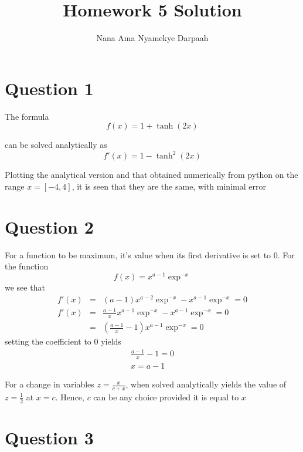 \documentclass[11pt]{article}
\title{Homework 5 Solution}
\author{Nana Ama Nyamekye Darpaah}
\begin{document}
	
	\maketitle
	
	
\section{Question 1}

The formula
	\begin{equation}
	f(x) = 1 + \tanh(2x) 
	\end{equation}

can be solved analytically as 
	\begin{equation}
	f'(x) = 1 - \tanh^{2}(2x) 
	\end{equation}

Plotting the analytical version and that obtained numerically from python on the range $x = [-4, 4]$, it is seen that they are the same, with minimal error



\section{Question 2}
For a function to be maximum, it's value when its first derivative is set to $0$. For the function 
\begin{equation}
	f(x) = x^{a-1}\exp^{-x} 
\end{equation}
we see that 
\begin{eqnarray}
	f'(x) &=& (a-1)x^{a-2}\exp^{-x} - x^{a-1}\exp^{-x} = 0 \\
	f'(x) &=& \frac{a-1}{x}x^{a-1}\exp^{-x} - x^{a-1}\exp^{-x} = 0\\
	      &=&  (\frac{a-1}{x} -1)x^{a-1}\exp^{-x} = 0
\end{eqnarray}
setting the coefficient to $0$ yields
\begin{eqnarray}
	\frac{a-1}{x} - 1 = 0 \\
	x = a - 1
\end{eqnarray}

For a change in variables $z = \frac{x}{c + x}$, when solved analytically yields the value of  $z = \frac{1}{2}$ at $x = c$. Hence, $c$ can be any choice provided it is equal to $x$





\section{Question 3}
\end{document}
